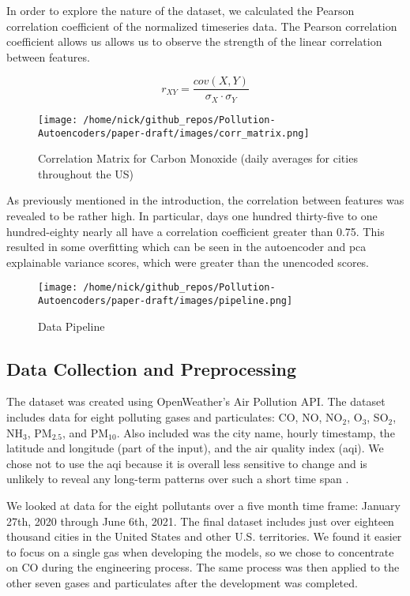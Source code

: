\documentclass{article}
\begin{document}
\par In order to explore the nature of the dataset, we calculated the Pearson correlation coefficient of the normalized timeseries data. The Pearson correlation coefficient allows us allows us to observe the strength of the linear correlation between features. 

\begin{equation*}
    r_{XY}=\frac{cov(X,Y)}{\sigma_{X} \cdot \sigma_{Y}}
\end{equation*}

\begin{figure}[h!]
\begin{center}
\texttt{[image: /home/nick/github\_repos/Pollution-Autoencoders/paper-draft/images/corr\_matrix.png]}
\end{center}
    \caption{Correlation Matrix for Carbon Monoxide (daily averages for cities throughout the US)}
\label{fig:matrix}
\end{figure}


\par As previously mentioned in the introduction, the correlation between features was revealed to be rather high. In particular, days one hundred thirty-five to one hundred-eighty nearly all have a correlation coefficient greater than 0.75. This resulted in some overfitting which can be seen in the autoencoder and pca explainable variance scores, which were greater than the unencoded scores.

\newpage
\begin{Center}
\begin{figure}[h!]
\caption{Data Pipeline}
\label{fig:pipeline}
    \begin{center}
    \texttt{[image: /home/nick/github\_repos/Pollution-Autoencoders/paper-draft/images/pipeline.png]}
    \end{center}
\end{figure}
\end{Center}

\subsection{Data Collection and Preprocessing}
The dataset was created using OpenWeather's Air Pollution API. The dataset includes data for 
eight polluting gases and particulates: CO, NO, NO$_2$, O$_3$, SO$_2$, NH$_3$, PM$_{2.5}$, 
and PM$_{10}$. Also included was the city name, hourly timestamp, the latitude and longitude (part of the input), and the air quality index (aqi). We chose not to use the aqi because it is overall less sensitive to change and is unlikely to reveal any long-term patterns over such a short time span .
\par We looked at data for the eight pollutants over a five month time frame: January 27th, 2020 through June 6th, 2021. The final dataset includes just over eighteen thousand cities in the United States and other U.S. territories. We found it easier to focus on a single gas when developing the models, so we chose to concentrate on CO during the engineering process. The same process was then applied to the other seven gases and particulates after the development was completed.
\end{document}
